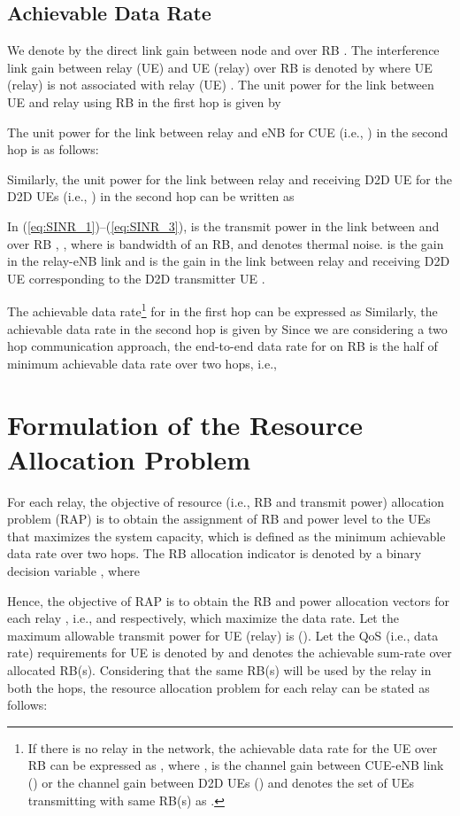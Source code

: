 \documentclass[twocolumn,10pt]{IEEEtran}
\begin{document}
\subsection{Achievable Data Rate}

We denote by  the direct link gain between node  and  over RB . The interference link gain between relay (UE)   and UE (relay)  over RB  is denoted by   where UE (relay)  is not associated with relay (UE) .  The unit power  for the link between UE  and relay  using RB  in the first hop is given by

The unit power  for the link between relay  and eNB  for CUE  (i.e.,  ) in the second hop is as follows: 

Similarly, the unit power  for the link between relay  and receiving D2D UE for the D2D UEs  (i.e., ) in the second hop can be written as


In  (\ref{eq:SINR_1})--(\ref{eq:SINR_3}),  is the transmit power in the  link between  and  over RB , , where  is bandwidth of an RB, and  denotes thermal noise.   is the gain in the relay-eNB link and  is the gain in the link between relay  and receiving D2D UE corresponding to the D2D transmitter UE .

The achievable data rate\footnote{If there is no relay in the network, the achievable data rate for the UE  over RB  can be expressed as , where ,  is the channel gain between CUE-eNB link () or the channel gain between D2D UEs () and   denotes the set of UEs transmitting with same RB(s) as .} for  in the first hop can be expressed as  Similarly, the achievable data rate in the second hop is given by  Since we are considering a two hop communication approach, the end-to-end data rate for   on RB  is the half of minimum achievable data rate over two hops, i.e.,   


\section{Formulation of the Resource Allocation Problem} 
\label{sec:RAP}


For each relay, the objective of resource (i.e., RB and transmit power) allocation problem (RAP) is to obtain  the assignment of RB and power level to the UEs that maximizes the system capacity, which is defined as the minimum achievable data rate over two hops. The RB allocation indicator is denoted by a binary decision variable , where 


Hence, the objective of RAP is to obtain the RB and power allocation vectors for each relay , i.e., 
 and  respectively, which maximize the data rate. Let the maximum allowable transmit power for UE (relay) is  (). Let the QoS (i.e., data rate) requirements for UE  is denoted by  and  denotes the achievable sum-rate over allocated RB(s). Considering that the same RB(s) will be used by the relay in both the hops, the resource allocation problem for each relay  can be stated as follows:
\end{document}
